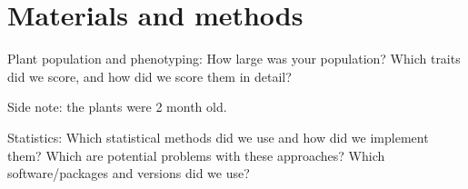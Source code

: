 \section{Materials and methods}

Plant population and phenotyping: How large was your population? Which traits did we score, and how did we score them in detail?

Side note: the plants were 2 month old.

Statistics: Which statistical methods did we use and how did we implement them? Which are potential problems with these approaches? Which software/packages and versions did we use?